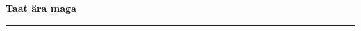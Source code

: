 \documentclass[10pt]{book}
\begin{document}
{
  \samepage
  \raggedbottom
  \raggedright
  \sloppy


  \vspace{0.2in}

  \noindent\begin{minipage}{.1\textwidth}
    \hfill\vspace{0.1in}
  \end{minipage}%
  \noindent\begin{minipage}{.8\textwidth}
    \centering
    \bfseries
    \large Taat \"ara maga
  \end{minipage}%
  \noindent\begin{minipage}{.1\textwidth}
      \hfill\vspace{0.1in}
  \end{minipage}

  \nopagebreak[4]
  \vspace{0.1in}
  \nopagebreak[4]
  \hrule height 0.05ex
  \nopagebreak[4]
  \vspace{-0.05in}




}
\end{document}
